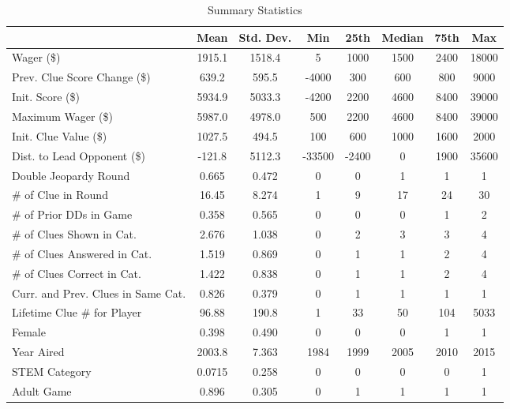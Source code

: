 \begin{table}[htbp]\centering
\def\sym#1{\ifmmode^{#1}\else\(^{#1}\)\fi}
\caption{Summary Statistics}
\begin{tabular}{l*{1}{ccccccc}}
\hline\hline
            &        Mean&   Std. Dev.&         Min&        25th&      Median&        75th&         Max\\
\hline
Wager (\$)  &      1915.1&      1518.4&           5&        1000&        1500&        2400&       18000\\
Prev. Clue Score Change (\$)&       639.2&       595.5&       -4000&         300&         600&         800&        9000\\
Init. Score (\$)&      5934.9&      5033.3&       -4200&        2200&        4600&        8400&       39000\\
Maximum Wager (\$)&      5987.0&      4978.0&         500&        2200&        4600&        8400&       39000\\
Init. Clue Value (\$)&      1027.5&       494.5&         100&         600&        1000&        1600&        2000\\
Dist. to Lead Opponent (\$)&      -121.8&      5112.3&      -33500&       -2400&           0&        1900&       35600\\
Double Jeopardy Round&       0.665&       0.472&           0&           0&           1&           1&           1\\
\# of Clue in Round&       16.45&       8.274&           1&           9&          17&          24&          30\\
\# of Prior DDs in Game&       0.358&       0.565&           0&           0&           0&           1&           2\\
\# of Clues Shown in Cat.&       2.676&       1.038&           0&           2&           3&           3&           4\\
\# of Clues Answered in Cat.&       1.519&       0.869&           0&           1&           1&           2&           4\\
\# of Clues Correct in Cat.&       1.422&       0.838&           0&           1&           1&           2&           4\\
Curr. and Prev. Clues in Same Cat.&       0.826&       0.379&           0&           1&           1&           1&           1\\
Lifetime Clue \# for Player&       96.88&       190.8&           1&          33&          50&         104&        5033\\
Female      &       0.398&       0.490&           0&           0&           0&           1&           1\\
Year Aired  &      2003.8&       7.363&        1984&        1999&        2005&        2010&        2015\\
STEM Category&      0.0715&       0.258&           0&           0&           0&           0&           1\\
Adult Game  &       0.896&       0.305&           0&           1&           1&           1&           1\\
\hline\hline
\end{tabular}
\end{table}
